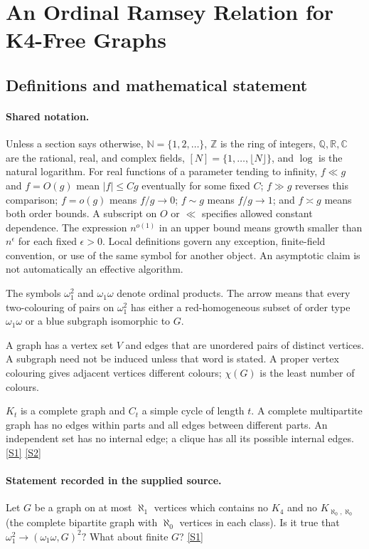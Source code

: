 \documentclass[11pt,a4paper]{article}
\newcommand{\N}{\mathbb{N}}
\newcommand{\Z}{\mathbb{Z}}
\newcommand{\Q}{\mathbb{Q}}
\newcommand{\R}{\mathbb{R}}
\newcommand{\C}{\mathbb{C}}
\newcommand{\sref}[2]{\hyperlink{source:#1:#2}{[S#2]}}
\begin{document}
\section{An Ordinal Ramsey Relation for K4-Free Graphs}\label{statement}


\subsection{Definitions and mathematical statement}

\paragraph{Shared notation.}Unless a section says otherwise, $\N=\{1,2,\ldots\}$,
$\Z$ is the ring of integers, $\Q,\R,\C$ are the rational, real, and complex
fields, $[N]=\{1,\ldots,\lfloor N\rfloor\}$, and $\log$ is the natural
logarithm. For real functions of a parameter tending to infinity,
$f\ll g$ and $f=O(g)$ mean $|f|\leq Cg$ eventually for some fixed $C$;
$f\gg g$ reverses this comparison; $f=o(g)$ means $f/g\to0$;
$f\sim g$ means $f/g\to1$; and $f\asymp g$ means both order bounds.
A subscript on $O$ or $\ll$ specifies allowed constant dependence.
The expression $n^{o(1)}$ in an upper bound means growth smaller than
$n^\epsilon$ for each fixed $\epsilon>0$. Local definitions govern any
exception, finite-field convention, or use of the same symbol for another
object. An asymptotic claim is not automatically an effective algorithm.



The symbols $\omega_1^2$ and $\omega_1\omega$ denote ordinal products. The arrow means that every two-colouring of pairs on $\omega_1^2$ has either a red-homogeneous subset of order type $\omega_1\omega$ or a blue subgraph isomorphic to $G$.

A graph has a vertex set $V$ and edges that are unordered pairs of distinct vertices. A subgraph need not be induced unless that word is stated. A proper vertex colouring gives adjacent vertices different colours; $\chi(G)$ is the least number of colours.

$K_t$ is a complete graph and $C_t$ a simple cycle of length $t$. A complete multipartite graph has no edges within parts and all edges between different parts. An independent set has no internal edge; a clique has all its possible internal edges. \sref{statement}{1} \sref{statement}{2}

\paragraph{Statement recorded in the supplied source.}
Let $G$ be a graph on at most $\aleph_1$ vertices which contains no $K_4$ and no $K_{\aleph_0,\aleph_0}$ (the complete bipartite graph with $\aleph_0$ vertices in each class). Is it true that $ \omega_1^2 \to (\omega_1\omega, G)^2? $ What about finite $G$? \sref{statement}{1}
\end{document}
